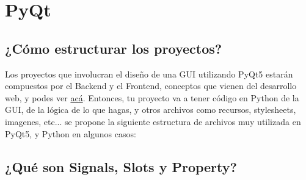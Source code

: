 \section{PyQt}

\subsection{¿C\'omo estructurar los proyectos?}
Los proyectos que involucran el dise\~no de una GUI utilizando PyQt5 estar\'an compuestos por el Backend y el Frontend, conceptos
que vienen del desarrollo web, y podes ver \href{https://platzi.com/blog/que-es-frontend-y-backend/}{ac\'a}. Entonces, tu proyecto va a tener
c\'odigo en Python de la GUI, de la l\'ogica de lo que hagas, y otros archivos como recursos, stylesheets, imagenes, etc... se propone la siguiente
estructura de archivos muy utilizada en PyQt5, y Python en algunos casos:

\begin{center}
    \begin{minipage}{10cm}
    \end{minipage}
\end{center}

\subsection{¿Qu\'e son Signals, Slots y Property?}
\label{signal_slot_property}